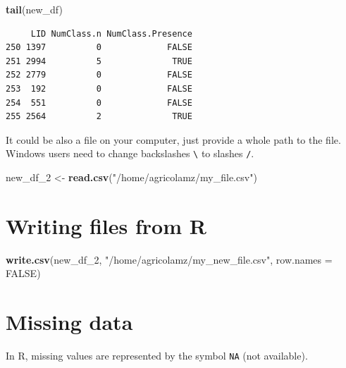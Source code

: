 \documentclass[]{book}
\newenvironment{Shaded}{\begin{snugshade}}{\end{snugshade}}
\newcommand{\KeywordTok}[1]{\textcolor[rgb]{0.13,0.29,0.53}{\textbf{#1}}}
\newcommand{\DataTypeTok}[1]{\textcolor[rgb]{0.13,0.29,0.53}{#1}}
\newcommand{\DecValTok}[1]{\textcolor[rgb]{0.00,0.00,0.81}{#1}}
\newcommand{\StringTok}[1]{\textcolor[rgb]{0.31,0.60,0.02}{#1}}
\newcommand{\OtherTok}[1]{\textcolor[rgb]{0.56,0.35,0.01}{#1}}
\newcommand{\OperatorTok}[1]{\textcolor[rgb]{0.81,0.36,0.00}{\textbf{#1}}}
\newcommand{\NormalTok}[1]{#1}
\theoremstyle{definition}
\theoremstyle{definition}
\theoremstyle{definition}
\theoremstyle{remark}
\begin{document}
\begin{Shaded}
\begin{Highlighting}[]
\KeywordTok{tail}\NormalTok{(new_df)}
\end{Highlighting}
\end{Shaded}

\begin{verbatim}
     LID NumClass.n NumClass.Presence
250 1397          0             FALSE
251 2994          5              TRUE
252 2779          0             FALSE
253  192          0             FALSE
254  551          0             FALSE
255 2564          2              TRUE
\end{verbatim}

It could be also a file on your computer, just provide a whole path to
the file. Windows users need to change backslashes
\texttt{\textbackslash{}} to slashes \texttt{/}.

\begin{Shaded}
\begin{Highlighting}[]
\NormalTok{new_df_}\DecValTok{2}\NormalTok{ <-}\StringTok{ }\KeywordTok{read.csv}\NormalTok{(}\StringTok{"/home/agricolamz/my_file.csv"}\NormalTok{)}
\end{Highlighting}
\end{Shaded}

\section{Writing files from R}\label{writing-files-from-r}

\begin{Shaded}
\begin{Highlighting}[]
\KeywordTok{write.csv}\NormalTok{(new_df_}\DecValTok{2}\NormalTok{, }\StringTok{"/home/agricolamz/my_new_file.csv"}\NormalTok{,}
          \DataTypeTok{row.names =} \OtherTok{FALSE}\NormalTok{)}
\end{Highlighting}
\end{Shaded}

\section{Missing data}\label{missing-data}

In R, missing values are represented by the symbol \texttt{NA} (not
available).

\begin{Shaded}
\end{Shaded}
\end{document}
